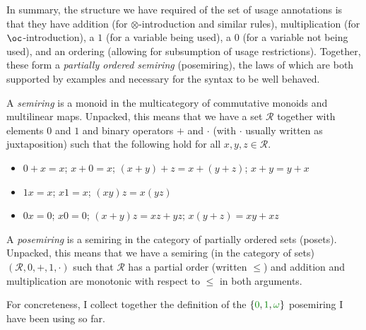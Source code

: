 In summary, the structure we have required of the set of usage annotations is
that they have addition (for $\otimes$-introduction and similar rules),
multiplication (for $\oc$-introduction), a $1$ (for a variable being used), a
$0$ (for a variable not being used), and an ordering (allowing for subsumption
of usage restrictions).
Together, these form a \emph{partially ordered semiring} (posemiring), the laws
of which are both supported by examples and necessary for the syntax to be well
behaved.

\begin{definition}
  A \emph{semiring} is a monoid in the multicategory of commutative monoids and
  multilinear maps.
  Unpacked, this means that we have a set $\mathscr R$ together with elements
  $0$ and $1$ and binary operators $+$ and $\cdot$ (with $\cdot$ usually written
  as juxtaposition) such that the following hold for all
  $x, y, z \in \mathscr R$.
  \begin{itemize}
    \item $0 + x = x$; $x + 0 = x$; $(x + y) + z = x + (y + z)$; $x + y = y + x$
    \item $1x = x$; $x1 = x$; $(xy)z = x(yz)$
    \item $0x = 0$; $x0 = 0$; $(x + y)z = xz + yz$; $x(y + z) = xy + xz$
  \end{itemize}
\end{definition}
\begin{definition}
  A \emph{posemiring} is a semiring in the category of partially ordered sets
  (posets).
  Unpacked, this means that we have a semiring (in the category of sets)
  $(\mathscr R, 0, +, 1, \cdot)$ such that $\mathscr R$ has a partial order
  (written $\leq$) and addition and multiplication are monotonic with respect
  to $\leq$ in both arguments.
\end{definition}

For concreteness, I collect together the definition of the
$\{\gr0, \gr1, \gr\omega\}$ posemiring I have been using so far.


